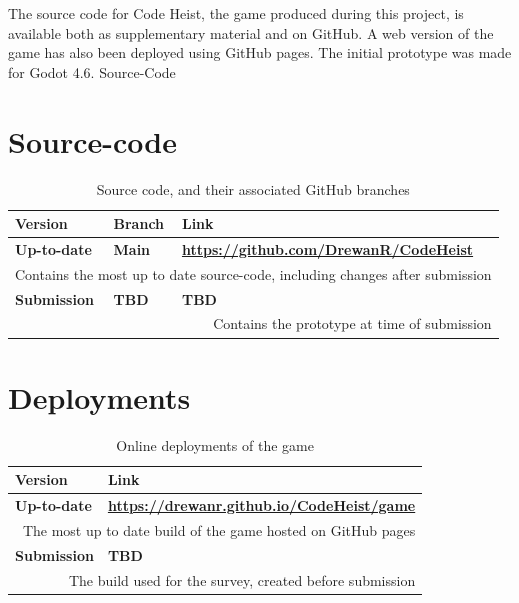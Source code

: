 
The source code for Code Heist, the game produced during this project, is available
both as supplementary material and on GitHub. A web version of the game has also
been deployed using GitHub pages. The initial prototype was made for Godot 4.6.
Source-Code

\section{Source-code}\label{sec:source_code}

\begin{table}[H]
    \begin{tabularx}{1.0\textwidth} { 
       ll>{\raggedleft\arraybackslash}X  }
         Version &  Branch& Link\\\toprule
         \textbf{Up-to-date} & \textbf{Main}& \textbf{\href{https://github.com/DrewanR/CodeHeist}{https://github.com/DrewanR/CodeHeist}}\\
         \multicolumn{3}{r}{Contains the most up to date source-code, including changes after submission}\\
         \textbf{Submission}&  \textbf{TBD}& \textbf{TBD}\\
         \multicolumn{3}{r}{Contains the prototype at time of submission}\\\bottomrule
    \end{tabularx}
    \caption{Source code, and their associated GitHub branches}
    \label{tab:source_repo_table}
\end{table}

\section{Deployments}\label{sec:deployments}

\begin{table}[H]
    \begin{tabularx}{1.0\textwidth} { 
       l>{\raggedleft\arraybackslash}X  }
         Version & Link\\\toprule
         \textbf{Up-to-date} & \textbf{\href{https://drewanr.github.io/CodeHeist/game}{https://drewanr.github.io/CodeHeist/game}}\\
         \multicolumn{2}{r}{The most up to date build of the game hosted on GitHub pages}\\
         \textbf{Submission}&  \textbf{TBD}\\
         \multicolumn{2}{r}{The build used for the survey, created before submission}\\\bottomrule
    \end{tabularx}
    \label{tab:deployment_table}
    \caption{Online deployments of the game}
\end{table}

